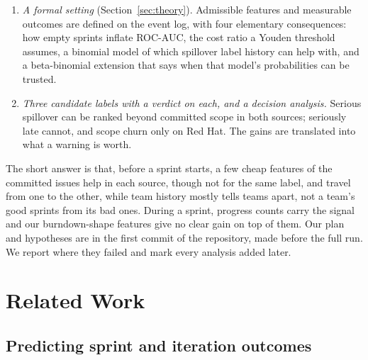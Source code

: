 \begin{enumerate}
\item \emph{A formal setting} (Section~\ref{sec:theory}). Admissible features and measurable outcomes are defined on the event log, with four elementary consequences: how empty sprints inflate ROC-AUC, the cost ratio a Youden threshold assumes, a binomial model of which spillover label history can help with, and a beta-binomial extension that says when that model's probabilities can be trusted.
\item \emph{Three candidate labels with a verdict on each, and a decision analysis.} Serious spillover can be ranked beyond committed scope in both sources; seriously late cannot, and scope churn only on Red Hat. The gains are translated into what a warning is worth.
\end{enumerate}

The short answer is that, before a sprint starts, a few cheap features of the committed issues help in each source, though not for the same label, and travel from one to the other, while team history mostly tells teams apart, not a team's good sprints from its bad ones. During a sprint, progress counts carry the signal and our burndown-shape features give no clear gain on top of them. Our plan and hypotheses are in the first commit of the repository, made before the full run. We report where they failed and mark every analysis added later.

\section{Related Work}
\label{sec:related}

\subsection{Predicting sprint and iteration outcomes}

